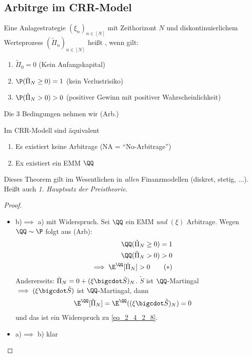 \subsection*{Arbitrge im CRR-Model}
\begin{definition}
	Eine Anlagestrategie $(\xi_n)_{n \in[N]}$ mit Zeithorizont $N$ und diskontinuierlichem Werteprozess $(\tilde{\Pi}_n)_{n \in [N]}$ heißt , wenn gilt:
	\begin{enumerate}
		\item $\tilde{\Pi}_0 = 0$ (Kein Anfangskapital)
		\item $\P(\tilde{\Pi}_N \ge 0) = 1$ (kein Verlustrisiko)
		\item $\P(\tilde{\Pi}_N > 0) > 0$ (positiver Gewinn mit positiver Wahrscheinlichkeit)
	\end{enumerate}
	Die 3 Bedingungen nehmen wir (Arb.) %
\end{definition}
\begin{theorem} %
	Im CRR-Modell sind äquivalent
	\begin{enumerate}
		\item Es existiert keine Arbitrage (NA = ``No-Arbitrage'')
		\item Ex existiert ein EMM $\QQ$ 
	\end{enumerate}
\end{theorem}
\begin{*remark}
	Dieses Theorem gilt im Wesentlichen in \emph{allen} Finanzmodellen (diskret, stetig, ...). Heißt auch \emph{1. Hauptsatz der Preistheorie}.
\end{*remark}
\begin{proof}
	\begin{itemize}
		\item b)$ \implies$ a) mit Widerspruch. Sei $\QQ$ ein EMM \emph{und} $(\xi)$ Arbitrage. Wegen $\QQ \sim \P$ folgt aus (Arb):
		\begin{align*}
			\QQ(\tilde{\Pi}_N \ge 0) = 1\\
			\QQ(\tilde{\Pi}_N > 0) > 0\\
			\implies \E^{\QQ}[\tilde{\Pi}_N] > 0 \tag{$\ast$}\label{eq_2_4_2_8}
		\end{align*}
		Andererseits: $\tilde{\Pi}_N = 0 + (\xi \bigcdot \tilde{S})_N$. $\tilde{S}$ ist $\QQ$-Martingal $\implies (\xi \bigcdot \tilde{S})$ ist $\QQ$-Martingal, dann
		\begin{align*}
			\E^{\QQ}[\tilde{\Pi}_N] = \E^{\QQ}((\xi \bigcdot \tilde{S})_N) = 0
		\end{align*}
		und das ist ein Widerspruch zu \eqref{eq_2_4_2_8}.
		\item a)$ \implies$ b) klar \checkmark
	\end{itemize}
\end{proof}